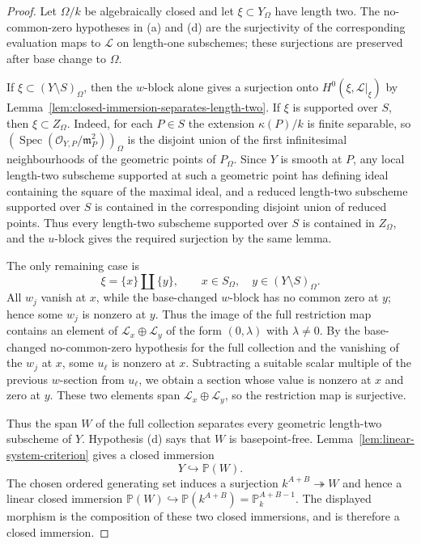 \documentclass{lms}
\DeclareMathOperator{\Spec}{Spec}
\newcommand{\PP}{\mathbb P}
\newcommand{\OO}{\mathcal O}
\newcommand{\kk}{\kappa}
\newcommand{\mm}{\mathfrak m}
\begin{document}
\begin{proof}
Let $\Omega/k$ be algebraically closed and let $\xi\subset Y_\Omega$ have length two.  The no-common-zero hypotheses in (a) and (d) are the surjectivity of the corresponding evaluation maps to $\mathcal L$ on length-one subschemes; these surjections are preserved after base change to $\Omega$.

If $\xi\subset (Y\setminus S)_\Omega$, then the $w$-block alone gives a surjection onto $H^0(\xi,\mathcal L|_\xi)$ by Lemma~\ref{lem:closed-immersion-separates-length-two}.  If $\xi$ is supported over $S$, then $\xi\subset Z_\Omega$.  Indeed, for each $P\in S$ the extension $\kk(P)/k$ is finite separable, so $(\Spec(\OO_{Y,P}/\mm_P^2))_\Omega$ is the disjoint union of the first infinitesimal neighbourhoods of the geometric points of $P_\Omega$.  Since $Y$ is smooth at $P$, any local length-two subscheme supported at such a geometric point has defining ideal containing the square of the maximal ideal, and a reduced length-two subscheme supported over $S$ is contained in the corresponding disjoint union of reduced points.  Thus every length-two subscheme supported over $S$ is contained in $Z_\Omega$, and the $u$-block gives the required surjection by the same lemma.

The only remaining case is
\[
        \xi=\{x\}\amalg\{y\},
        \qquad
        x\in S_\Omega,
        \quad
        y\in (Y\setminus S)_\Omega.
\]
All $w_j$ vanish at $x$, while the base-changed $w$-block has no common zero at $y$; hence some $w_j$ is nonzero at $y$.  Thus the image of the full restriction map contains an element of $\mathcal L_x\oplus\mathcal L_y$ of the form $(0,\lambda)$ with $\lambda\ne0$.  By the base-changed no-common-zero hypothesis for the full collection and the vanishing of the $w_j$ at $x$, some $u_\ell$ is nonzero at $x$.  Subtracting a suitable scalar multiple of the previous $w$-section from $u_\ell$, we obtain a section whose value is nonzero at $x$ and zero at $y$.  These two elements span $\mathcal L_x\oplus\mathcal L_y$, so the restriction map is surjective.

Thus the span $W$ of the full collection separates every geometric length-two subscheme of $Y$.  Hypothesis (d) says that $W$ is basepoint-free.  Lemma~\ref{lem:linear-system-criterion} gives a closed immersion
\[
        Y\hookrightarrow\PP(W).
\]
The chosen ordered generating set induces a surjection $k^{A+B}\twoheadrightarrow W$ and hence a linear closed immersion $\PP(W)\hookrightarrow\PP(k^{A+B})=\PP^{A+B-1}_k$.  The displayed morphism is the composition of these two closed immersions, and is therefore a closed immersion.
\end{proof}
\end{document}
